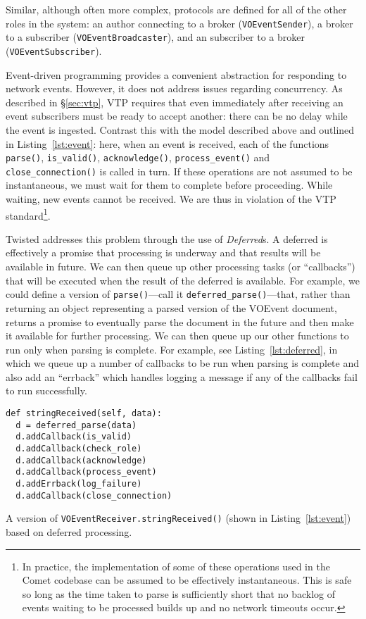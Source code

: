 \documentclass[5p,authoryear]{elsarticle}
\begin{document}
Similar, although often more complex, protocols are defined for all of the
other roles in the system: an author connecting to a broker
(\texttt{VOEventSender}), a broker to a subscriber
(\texttt{VOEventBroadcaster}), and an subscriber to a broker
(\texttt{VOEventSubscriber}).

Event-driven programming provides a convenient abstraction for responding to
network events. However, it does not address issues regarding concurrency. As
described in \S\ref{sec:vtp}, VTP requires that even immediately after
receiving an event subscribers must be ready to accept another: there can be
no delay while the event is ingested. Contrast this with the model described
above and outlined in Listing~\ref{lst:event}: here, when an event is
received, each of the functions \texttt{parse()}, \texttt{is\_valid()},
\texttt{acknowledge()}, \texttt{process\_event()} and
\texttt{close\_connection()} is called in turn.  If these operations are not
assumed to be instantaneous, we must wait for them to complete before
proceeding. While waiting, new events cannot be received.  We are thus in
violation of the VTP standard\footnote{In practice, the implementation of some
of these operations used in the Comet codebase can be assumed to be
effectively instantaneous.  This is safe so long as the time taken to parse is
sufficiently short that no backlog of events waiting to be processed  builds
up and no network timeouts occur.}.

Twisted addresses this problem through the use of \textit{Deferred}s. A
deferred is effectively a promise that processing is underway and that results
will be available in future. We can then queue up other processing tasks (or
``callbacks'') that will be executed when the result of the deferred is
available. For example, we could define a version of
\texttt{parse()}---call it
\texttt{deferred\_parse()}---that, rather than returning an object
representing a parsed version of the VOEvent document, returns a promise to
eventually parse the document in the future and then make it available for
further processing. We can then queue up our other functions to run only when
parsing is complete. For example, see Listing~\ref{lst:deferred}, in which we
queue up a number of callbacks to be run when parsing is complete and also add
an ``errback'' which handles logging a message if any of the callbacks fail to
run successfully.

\begin{listing}
\begin{verbatim}
def stringReceived(self, data):
  d = deferred_parse(data)
  d.addCallback(is_valid)
  d.addCallback(check_role)
  d.addCallback(acknowledge)
  d.addCallback(process_event)
  d.addErrback(log_failure)
  d.addCallback(close_connection)
\end{verbatim}
\caption{A version of \texttt{VOEventReceiver.stringReceived()} (shown in
Listing~\ref{lst:event}) based on deferred processing.}
\label{lst:deferred}
\end{listing}
\end{document}
